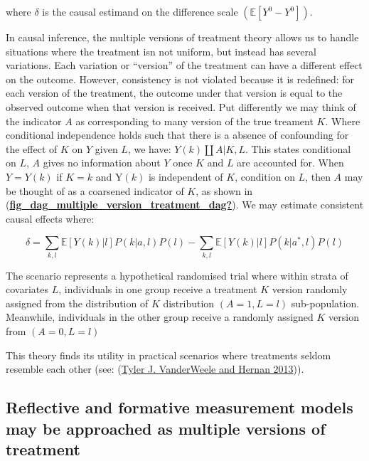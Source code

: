 \documentclass[
  singlecolumn]{report}
\begin{document}
where \(\delta\) is the causal estimand on the difference scale
\((\mathbb{E}[Y^0 - Y^0])\).

In causal inference, the multiple versions of treatment theory allows us
to handle situations where the treatment isn not uniform, but instead
has several variations. Each variation or ``version'' of the treatment
can have a different effect on the outcome. However, consistency is not
violated because it is redefined: for each version of the treatment, the
outcome under that version is equal to the observed outcome when that
version is received. Put differently we may think of the indicator \(A\)
as corresponding to many version of the true treament \(K\). Where
conditional independence holds such that there is a absence of
confounding for the effect of \(K\) on \(Y\) given \(L\), we have:
\(Y(k)\coprod A|K,L\). This states conditional on \(L\), \(A\) gives no
information about \(Y\) once \(K\) and \(L\) are accounted for. When
\(Y = Y(k)\) if \(K = k\) and Y\((k)\) is independent of \(K\),
condition on \(L\), then \(A\) may be thought of as a coarsened
indicator of \(K\), as shown in
(\protect\hyperlink{ref-fig_dag_multiple_version_treatment_dag}{\textbf{fig\_dag\_multiple\_version\_treatment\_dag?}}).
We may estimate consistent causal effects where:

\[ \delta = \sum_{k,l} \mathbb{E}[Y(k)|l] P(k|a,l) P(l) - \sum_{k,l} \mathbb{E}[Y(k)|l] P(k|a^*,l) P(l)\]

The scenario represents a hypothetical randomised trial where within
strata of covariates \(L\), individuals in one group receive a treatment
\(K\) version randomly assigned from the distribution of \(K\)
distribution \((A = 1, L = l)\) sub-population. Meanwhile, individuals
in the other group receive a randomly assigned \(K\) version from
\((A = 0, L = l)\)

This theory finds its utility in practical scenarios where treatments
seldom resemble each other (see:
(\protect\hyperlink{ref-vanderweele2013}{Tyler J. VanderWeele and Hernan
2013})).

\hypertarget{reflective-and-formative-measurement-models-may-be-approached-as-multiple-versions-of-treatment}{%
\subsection{Reflective and formative measurement models may be
approached as multiple versions of
treatment}\label{reflective-and-formative-measurement-models-may-be-approached-as-multiple-versions-of-treatment}}
\end{document}
